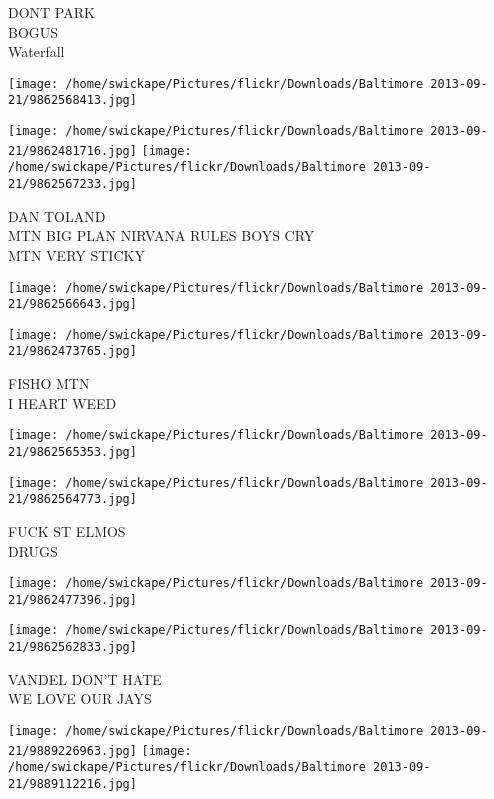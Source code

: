 \documentclass[10pt,letterpaper]{article}
\begin{document}
DONT PARK\\
BOGUS\\
Waterfall\\
\pagebreak

\texttt{[image: /home/swickape/Pictures/flickr/Downloads/Baltimore 2013-09-21/9862568413.jpg]}

\vspace{0.25in}
\texttt{[image: /home/swickape/Pictures/flickr/Downloads/Baltimore 2013-09-21/9862481716.jpg]}
\texttt{[image: /home/swickape/Pictures/flickr/Downloads/Baltimore 2013-09-21/9862567233.jpg]}

DAN TOLAND\\
MTN BIG PLAN NIRVANA RULES BOYS CRY\\
MTN VERY STICKY\\
\pagebreak

\texttt{[image: /home/swickape/Pictures/flickr/Downloads/Baltimore 2013-09-21/9862566643.jpg]}

\vspace{0.25in}
\texttt{[image: /home/swickape/Pictures/flickr/Downloads/Baltimore 2013-09-21/9862473765.jpg]}

FISHO MTN\\
I HEART WEED\\
\pagebreak

\texttt{[image: /home/swickape/Pictures/flickr/Downloads/Baltimore 2013-09-21/9862565353.jpg]}

\vspace{0.25in}
\texttt{[image: /home/swickape/Pictures/flickr/Downloads/Baltimore 2013-09-21/9862564773.jpg]}

FUCK ST ELMOS\\
DRUGS\\
\pagebreak

\texttt{[image: /home/swickape/Pictures/flickr/Downloads/Baltimore 2013-09-21/9862477396.jpg]}

\vspace{0.25in}
\texttt{[image: /home/swickape/Pictures/flickr/Downloads/Baltimore 2013-09-21/9862562833.jpg]}

VANDEL DON'T HATE\\
WE LOVE OUR JAYS\\
\pagebreak

\texttt{[image: /home/swickape/Pictures/flickr/Downloads/Baltimore 2013-09-21/9889226963.jpg]}
\texttt{[image: /home/swickape/Pictures/flickr/Downloads/Baltimore 2013-09-21/9889112216.jpg]}
\end{document}
